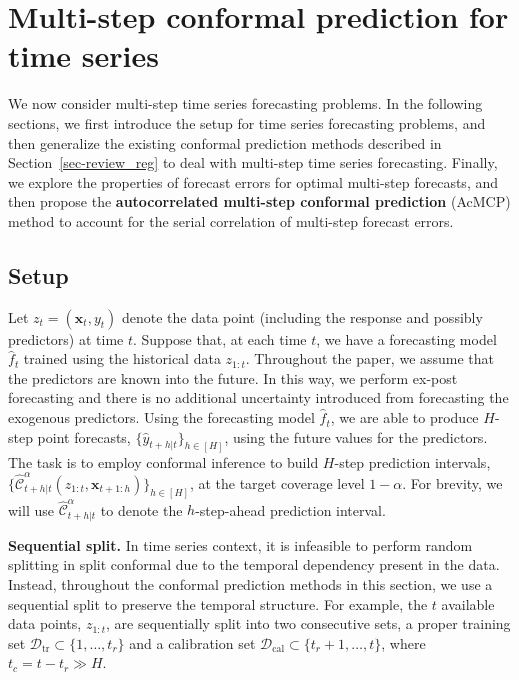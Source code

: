 \documentclass[
  11pt,
  a4paper,
]{article}
\theoremstyle{plain}
\theoremstyle{plain}
\theoremstyle{remark}
\begin{document}
\section{Multi-step conformal prediction for time
series}\label{sec-method}

We now consider multi-step time series forecasting problems. In the
following sections, we first introduce the setup for time series
forecasting problems, and then generalize the existing conformal
prediction methods described in Section~\ref{sec-review_reg} to deal
with multi-step time series forecasting. Finally, we explore the
properties of forecast errors for optimal multi-step forecasts, and then
propose the \textbf{autocorrelated multi-step conformal prediction}
(AcMCP) method to account for the serial correlation of multi-step
forecast errors.

\subsection{Setup}\label{sec-setup}

Let \(z_t = (\bm{x}_t, y_t)\) denote the data point (including the
response and possibly predictors) at time \(t\). Suppose that, at each
time \(t\), we have a forecasting model \(\hat{f}_t\) trained using the
historical data \(z_{1:t}\). Throughout the paper, we assume that the
predictors are known into the future. In this way, we perform ex-post
forecasting and there is no additional uncertainty introduced from
forecasting the exogenous predictors. Using the forecasting model
\(\hat{f}_t\), we are able to produce \(H\)-step point forecasts,
\(\{\hat{y}_{t+h|t}\}_{h\in[H]}\), using the future values for the
predictors. The task is to employ conformal inference to build
\(H\)-step prediction intervals,
\(\{\hat{\mathcal{C}}_{t+h|t}^{\alpha}\left(z_{1:t},\bm{x}_{t+1:h}\right)\}_{h\in[H]}\),
at the target coverage level \(1-\alpha\). For brevity, we will use
\(\hat{\mathcal{C}}_{t+h|t}^{\alpha}\) to denote the \(h\)-step-ahead
prediction interval.

\textbf{Sequential split.} In time series context, it is infeasible to
perform random splitting in split conformal due to the temporal
dependency present in the data. Instead, throughout the conformal
prediction methods in this section, we use a sequential split to
preserve the temporal structure. For example, the \(t\) available data
points, \(z_{1:t}\), are sequentially split into two consecutive sets, a
proper training set \(\mathcal{D}_{\text{tr}} \subset \{1,\ldots,t_r\}\)
and a calibration set
\(\mathcal{D}_{\text{cal}} \subset \{t_r+1,\ldots,t\}\), where
\(t_c=t-t_r \gg H\).
\end{document}
